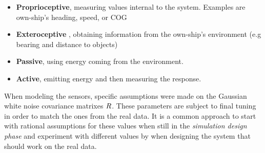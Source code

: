 \begin{itemize}
\item\textbf{Proprioceptive}, measuring values internal to
	the system. Examples are own-ship's heading, speed, or COG
	\item\textbf{Exteroceptive} , obtaining information from the own-ship's environment (e.g bearing and distance to objects)
	\item\textbf{Passive}, using energy coming from the
	environment. 
	\item\textbf{Active}, emitting energy and then measuring the response.
\end{itemize}
 

When modeling the sensors, specific assumptions were made on the Gaussian white noise covariance matrixes ${R}$. These parameters are subject to final tuning in order to match the ones from the real data. It is a common approach to start with rational assumptions for these values when still in the \emph{simulation design phase} and  experiment with different values by \emph{} when designing the system that should work on the real data. 

